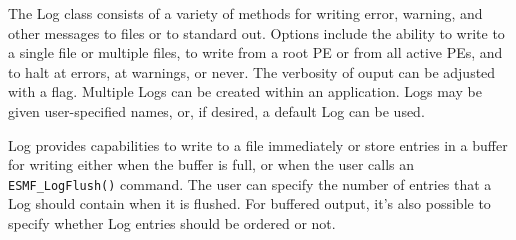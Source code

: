 
%













The Log class consists of a variety of methods for writing error, warning, 
and other messages to files or to standard out.  Options include the ability 
to write to a single file or multiple files, to write from a root PE or 
from all active PEs, and to halt at errors, at warnings, or never.  The 
verbosity of ouput can be adjusted with a flag.  Multiple Logs can be created 
within an application.  Logs may be given user-specified names, or, if desired, 
a default Log can be used.  



Log provides capabilities to write to a file immediately or store entries 
in a buffer for writing either when the buffer is full, or when the user
calls an {\tt ESMF\_LogFlush()} command.  The user can specify the number 
of entries that a Log should contain when it is flushed.  For buffered output, 
it's also possible to specify whether Log entries should be ordered or not.  





